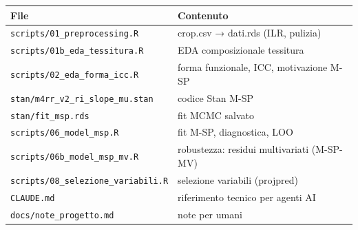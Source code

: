 \documentclass[11pt, a4paper]{article}
\begin{document}
\begin{tabular}{@{}ll@{}}
\toprule
File & Contenuto \\
\midrule
\texttt{scripts/01\_preprocessing.R} & crop.csv → dati.rds (ILR, pulizia) \\
\texttt{scripts/01b\_eda\_tessitura.R} & EDA composizionale tessitura \\
\texttt{scripts/02\_eda\_forma\_icc.R} & forma funzionale, ICC, motivazione M-SP \\
\texttt{stan/m4rr\_v2\_ri\_slope\_mu.stan} & codice Stan M-SP \\
\texttt{stan/fit\_msp.rds} & fit MCMC salvato \\
\texttt{scripts/06\_model\_msp.R} & fit M-SP, diagnostica, LOO \\
\texttt{scripts/06b\_model\_msp\_mv.R} & robustezza: residui multivariati (M-SP-MV) \\
\texttt{scripts/08\_selezione\_variabili.R} & selezione variabili (projpred) \\
\texttt{CLAUDE.md} & riferimento tecnico per agenti AI \\
\texttt{docs/note\_progetto.md} & note per umani \\
\bottomrule
\end{tabular}
\end{document}
